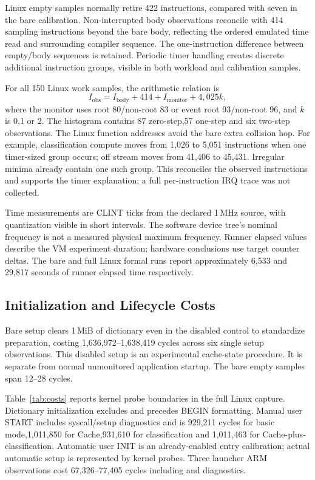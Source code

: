 Linux empty samples normally retire 422 instructions, compared with seven in the bare calibration. Non-interrupted body observations reconcile with 414 sampling instructions beyond the bare body, reflecting the ordered emulated time read and surrounding compiler sequence. The one-instruction difference between empty/body sequences is retained. Periodic timer handling creates discrete additional instruction groups, visible in both workload and calibration samples.

For all 150 Linux work samples, the arithmetic relation is
\begin{equation}
 I_{\mathrm{obs}}=I_{\mathrm{body}}+414+I_{\mathrm{monitor}}+4,025k,
\end{equation}
where the monitor uses root 80/non-root 83 or event root 93/non-root 96, and $k$ is 0,1 or 2. The histogram contains 87 zero-step,57 one-step and six two-step observations. The Linux function addresses avoid the bare extra collision hop. For example, classification compute moves from 1,026 to 5,051 instructions when one timer-sized group occurs; off stream moves from 41,406 to 45,431. Irregular minima already contain one such group. This reconciles the observed instructions and supports the timer explanation; a full per-instruction IRQ trace was not collected.

Time measurements are CLINT ticks from the declared 1\,MHz source, with quantization visible in short intervals. The software device tree's nominal frequency is not a measured physical maximum frequency. Runner elapsed values describe the VM experiment duration; hardware conclusions use target counter deltas. The bare and full Linux formal runs report approximately 6,533 and 29,817 seconds of runner elapsed time respectively.

\subsection{Initialization and Lifecycle Costs}

Bare setup clears 1\,MiB of dictionary even in the disabled control to standardize preparation, costing 1,636,972--1,638,419 cycles across six single setup observations. This disabled setup is an experimental cache-state procedure. It is separate from normal unmonitored application startup. The bare empty samples span 12--28 cycles.

Table~\ref{tab:costs} reports kernel probe boundaries in the full Linux capture. Dictionary initialization excludes  and precedes BEGIN formatting. Manual user START includes syscall/setup diagnostics and is 929,211 cycles for basic mode,1,011,850 for Cache,931,610 for classification and 1,011,463 for Cache-plus-classification. Automatic user INIT is an already-enabled entry calibration; actual automatic setup is represented by kernel probes. Three launcher ARM observations cost 67,326--77,405 cycles including  and diagnostics.

